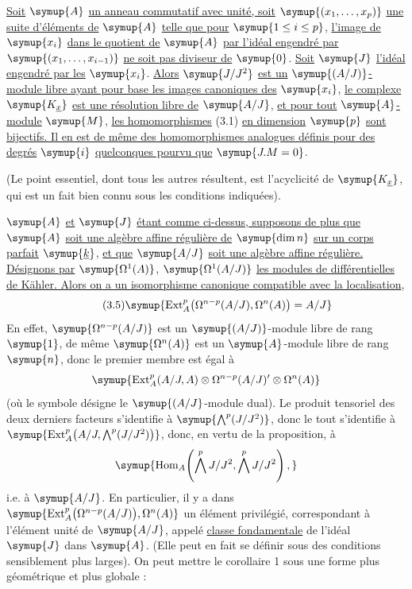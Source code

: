  \uline{Soit} $\symup{A}$ \uline{un anneau commutatif avec unité, soit}
$\symup{(x_1,\ldots,x_p)}$ \uline{une suite d'éléments de} $\symup{A}$ \uline{telle que pour} $\symup{1\leq i\leq p}$,
\uline{l'image de} $\symup{x_i}$ \uline{dans le quotient de} $\symup{A}$ \uline{par l'idéal engendré par}
$\symup{(x_1,\ldots,x_{i-1})}$ \uline{ne soit pas diviseur de} $\symup{0}$. \uline{Soit} $\symup{J}$ \uline{l'idéal engendré
par les} $\symup{x_i}$. \uline{Alors} $\symup{J/J^{2}}$ \uline{est un} $\symup{(A/J)}$\uline{-module libre ayant pour base les
images canoniques des} $\symup{x_i}$, \uline{le complexe} $\symup{K_{\underline{x}}}$ \uline{est une résolution
libre de} $\symup{A/J}$, \uline{et pour tout} $\symup{A}$\uline{-module} $\symup{M}$, \uline{les homomorphismes} (3.1) \uline{en
dimension} $\symup{p}$ \uline{sont bijectifs. Il en est de même des homomorphismes analogues
définis pour des degrés} $\symup{i}$ \uline{quelconques pourvu que} $\symup{J.M=0}$.

(Le point essentiel, dont tous les autres résultent, est l'acyclicité de
$\symup{K_{\underline{x}}}$, qui est un fait bien connu sous les conditions indiquées).

 $\symup{A}$ \uline{et} $\symup{J}$ \uline{étant comme ci-dessus, supposons de plus que}
$\symup{A}$ \uline{soit une algèbre affine régulière de} $\symup{\dim n}$ \uline{sur un corps parfait} $\symup{\underline{k}}$, \uline{et
que} $\symup{A/J}$ \uline{soit une algèbre affine régulière. Désignons par} $\symup{\Omega^{1}(A)}$,
$\symup{\Omega^{1}(A/J)}$ \uline{les modules de différentielles de Kähler. Alors on a un
isomorphisme canonique compatible avec la localisation},
\begin{equation}\tag{3.5}
  \symup{\operatorname{Ext}_{A}^{p}\bigl(\Omega^{n-p}(A/J),\Omega^{n}(A)\bigr)=A/J}
\end{equation}
En effet, $\symup{\Omega^{n-p}(A/J)}$ est un $\symup{(A/J)}$-module libre de rang $\symup{1}$, de même
$\symup{\Omega^{n}(A)}$ est un $\symup{A}$-module libre de rang $\symup{n}$,
donc le premier membre est égal à
\[
  \symup{\operatorname{Ext}_{A}^{p}(A/J,A)
  \otimes\Omega^{n-p}(A/J)'\otimes\Omega^{n}(A)}
\]
(où le symbole \fquote{$\symup{\prime}$} désigne le $\symup{(A/J}$-module dual). Le produit tensoriel des
deux derniers facteurs s'identifie à $\symup{\bigwedge^{p}(J/J^{2})}$, donc le tout
s'identifie à
$\symup{\operatorname{Ext}_{A}^{p}\!\left(A/J,\bigwedge^{p}(J/J^{2})\right)}$,
donc, en vertu de la proposition, à
\[
  \symup{\operatorname{Hom}_{A}\!\left(\bigwedge^{p}J/J^{2},
  \bigwedge^{p}J/J^{2}\right),}
\]
i.e. à $\symup{A/J}$. En particulier, il y a dans
$\symup{\operatorname{Ext}_{A}^{p}\bigl(\Omega^{n-p}(A/J)\bigr),\Omega^{n}(A)}$ un
élément privilégié, correspondant à l'élément unité de $\symup{A/J}$, appelé
\uline{classe fondamentale} de l'idéal $\symup{J}$ dans $\symup{A}$. (Elle peut en fait se
définir sous des conditions sensiblement plus larges). On peut mettre le
corollaire 1 sous une forme plus géométrique et plus globale :

